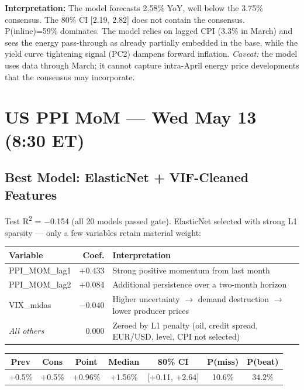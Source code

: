 \documentclass[11pt,a4paper]{article}
\begin{document}
\noindent\textbf{Interpretation:} The model forecasts 2.58\% YoY, well below the 3.75\% consensus. The 80\% CI [2.19, 2.82] does not contain the consensus. P(inline)=59\% dominates. The model relies on lagged CPI (3.3\% in March) and sees the energy pass-through as already partially embedded in the base, while the yield curve tightening signal (PC2) dampens forward inflation. \textit{Caveat:} the model uses data through March; it cannot capture intra-April energy price developments that the consensus may incorporate.

\newpage

\section*{US PPI MoM --- Wed May 13 (8:30 ET)}

\subsection*{Best Model: ElasticNet + VIF-Cleaned Features}
Test R\textsuperscript{2} = $-$0.154 (all 20 models passed gate). ElasticNet selected with strong L1 sparsity --- only a few variables retain material weight:

\begin{table}[H]
\centering\small
\begin{tabular}{lrl}
\toprule
\textbf{Variable} & \textbf{Coef.} & \textbf{Interpretation} \\
\midrule
PPI\_MOM\_lag1 & $+0.433$ & Strong positive momentum from last month \\
PPI\_MOM\_lag2 & $+0.084$ & Additional persistence over a two-month horizon \\
VIX\_midas & $-0.040$ & Higher uncertainty $\rightarrow$ demand destruction $\rightarrow$ lower producer prices \\
\textit{All others} & $0.000$ & Zeroed by L1 penalty (oil, credit spread, EUR/USD, level, CPI not selected) \\
\bottomrule
\end{tabular}
\end{table}

\begin{table}[H]
\centering\small
\begin{tabular}{ccccccc}
\toprule
\textbf{Prev} & \textbf{Cons} & \textbf{Point} & \textbf{Median} & \textbf{80\% CI} & \textbf{P(miss)} & \textbf{P(beat)} \\
\midrule
+0.5\% & +0.5\% & +0.96\% & +1.56\% & [+0.11, +2.64] & 10.6\% & 34.2\% \\
\bottomrule
\end{tabular}
\end{table}
\end{document}
